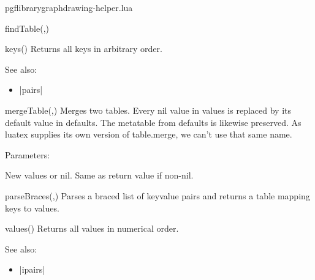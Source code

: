 \begin{filedescription}{pgflibrarygraphdrawing-helper.lua}
\begin{luacommand}{{findTable}(,)}
\end{luacommand}\begin{luacommand}{{keys}()}
Returns all keys in arbitrary order.



See also:
\begin{itemize}
	\item[] |pairs|
\end{itemize}

\end{luacommand}\begin{luacommand}{{mergeTable}(,)}
Merges two tables. Every nil value in values is replaced by its default value in defaults.  The metatable from defaults is likewise preserved. As luatex supplies its own version of table.merge, we can't use that same name.

Parameters:
\begin{parameterdescription}
	\item[\meta{values}] New values or nil.  Same as return value if non-nil.
\end{parameterdescription}



\end{luacommand}\begin{luacommand}{{parseBraces}(,)}
Parses a braced list of {key}{value} pairs and returns a table mapping keys to values.



\end{luacommand}\begin{luacommand}{{values}()}
Returns all values in numerical order.



See also:
\begin{itemize}
	\item[] |ipairs|
\end{itemize}

\end{luacommand}
\end{filedescription}